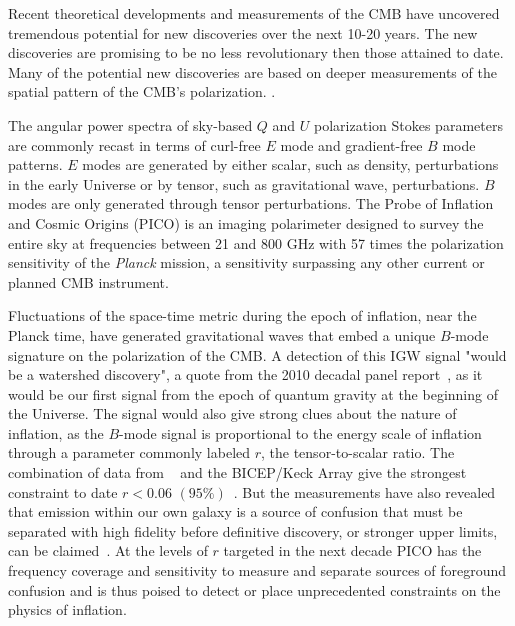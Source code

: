 \documentclass[PICOReport.tex]{subfiles}
\begin{document}

Recent theoretical developments and measurements of the \ac{CMB} have uncovered tremendous potential for new discoveries over the next 10-20 years. The new discoveries are promising to be no less revolutionary then those attained to date. Many of the potential new discoveries are based on deeper measurements of the spatial pattern of the CMB's polarization. .

The angular power spectra of sky-based $Q$ and $U$ polarization Stokes parameters are commonly recast in terms of curl-free $E$ mode and gradient-free $B$ mode patterns. $E$ modes are generated by either scalar, such as density, perturbations in the early Universe or by tensor, such as gravitational wave, perturbations. $B$ modes are only generated through tensor perturbations. The Probe of Inflation and Cosmic Origins (PICO) is an imaging polarimeter designed to survey the entire sky at frequencies between 21 and 800 GHz with 57 times the polarization sensitivity of the {\it Planck} mission, a sensitivity surpassing any other current or planned CMB instrument. 

Fluctuations of the space-time metric during the epoch of inflation, near the Planck time, have generated gravitational waves that embed a unique $B$-mode signature on the polarization of the CMB. A detection of this \ac{IGW} signal "would be a watershed discovery", a quote from the 2010 decadal panel report~\citep{nwnh}{\color{blue}\citep{blandford2010}}, as it would be our first signal from the epoch of quantum gravity at the beginning of the Universe. The signal would also give strong clues about the nature of inflation, as the $B$-mode signal is proportional to the energy scale of inflation through a parameter commonly labeled $r$, the tensor-to-scalar ratio. The combination of data from \planck~ and the BICEP/Keck Array give the strongest constraint to date $r<0.06\,\, (95\%)$~\citep{rlimit}.   {\color{blue}\citep{2018arXiv181005216A}}
But the measurements have also revealed that emission within our own galaxy is a source of confusion that must be separated with high fidelity before definitive discovery, or stronger upper limits, can be claimed~\citep{whichplanck}. At the levels of $r$ targeted in the next decade PICO has the frequency coverage and sensitivity to measure and separate sources of foreground confusion and is thus poised to detect or place unprecedented constraints on the physics of inflation. 
\end{document}
